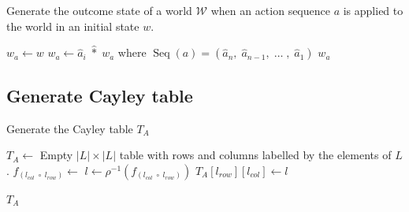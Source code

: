 \begin{algorithm}[H]
\caption{
Generate the outcome state of a world $\mathscr{W}$ when an action sequence $a$ is applied to the world in an initial state $w$.
}
\label{alg:GenerateActionOutcome}
\hrulefill
\begin{algorithmic}[1]
    \State $w_{a} \gets w$
        \State $w_{a} \gets \hat{a}_{i} \; \hat{\ast} \; w_{a}$ where $\operatorname{Seq}(a) = (\hat{a}_n, \; \hat{a}_{n-1}, \; \dots \;, \; \hat{a}_1)$
    \EndFor
    \State \Return $w_{a}$
\EndProcedure
\end{algorithmic}
\end{algorithm}


\subsection{Generate Cayley table}

\begin{algorithm}[H]
\caption{
Generate the Cayley table $T_{A}$
}
\hrulefill
\begin{algorithmic}[1]
    \State $T_{A} \gets$ Empty $|L| \times |L|$ table with rows and columns labelled by the elements of $L$.
    \Statex {}
            \Statex {}
            \State $f_{(l_{col} \; \circ \; l_{row})} \gets$ 
            \State $l \gets \rho^{-1}(f_{(l_{col} \; \circ \; l_{row})})$
            \State $T_{A}[l_{row}][l_{col}] \gets l$

            
        \EndFor
    \EndFor
    
    \State \Return $T_{A}$
\EndProcedure
\end{algorithmic}
\end{algorithm}


